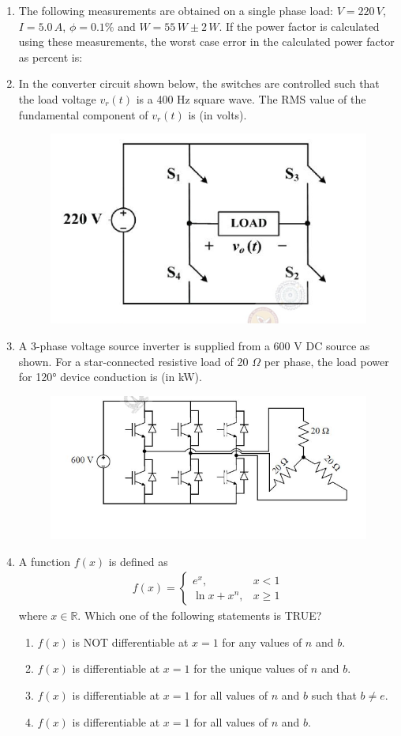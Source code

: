 \documentclass[journal,12pt,onecolumn]{IEEEtran}
\theoremstyle{remark}
\begin{document}
\begin{enumerate}
\item The following measurements are obtained on a single phase load: $V = 220\,V$, $I = 5.0\,A$, $\phi = 0.1\%$ and $W = 55\,W \pm 2\,W$. If the power factor is calculated using these measurements, the worst case error in the calculated power factor as percent is:  

\item In the converter circuit shown below, the switches are controlled such that the load voltage $v_r(t)$ is a 400 Hz square wave.  
The RMS value of the fundamental component of $v_r(t)$ is (in volts).
\begin{figure}[H]
    \centering
    \includegraphics[width=0.5\columnwidth]{figs/24.png}
    \caption{}
    \label{fig:placeholder}
\end{figure}

\item A 3-phase voltage source inverter is supplied from a 600 V DC source as shown. For a star-connected resistive load of 20 $\Omega$ per phase, the load power for 120° device conduction is (in kW).
\begin{figure}[H]
    \centering
    \includegraphics[width=0.5\columnwidth]{figs/25.png}
    \caption{}
    \label{fig:placeholder}
\end{figure}

\item A function $f(x)$ is defined as
\begin{align*}
    f(x) = \begin{cases}
e^x, & x < 1 \\
\ln x + x^n, & x \geq 1
\end{cases}
\end{align*}
where $x \in \mathbb{R}$. Which one of the following statements is TRUE?
\begin{enumerate}
\item $f(x)$ is NOT differentiable at $x=1$ for any values of $n$ and $b$.
\item $f(x)$ is differentiable at $x=1$ for the unique values of $n$ and $b$.
\item $f(x)$ is differentiable at $x=1$ for all values of $n$ and $b$ such that $b \neq e$.
\item $f(x)$ is differentiable at $x=1$ for all values of $n$ and $b$.
\end{enumerate}


\end{enumerate}
\end{document}
